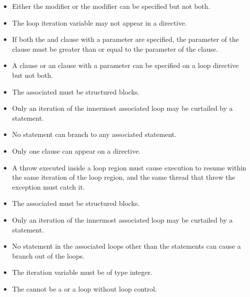 \begin{itemize}
\item Either the  modifier or the  modifier can be specified but not both.

\item The loop iteration variable may not appear in a  directive.

\item If both the  and  clause with a parameter are specified,
the parameter of the  clause must be greater than or equal to the parameter of the
 clause.

\item A  clause or an  clause with a parameter can be specified on a loop directive but not both.
\end{itemize}

\begin{ccppspecific}
\begin{itemize}
\item The associated  must be structured blocks.

\item Only an iteration of the innermost associated loop may be curtailed by a  
statement.

\item No statement can branch to any associated  statement.

\item Only one  clause can appear on a  directive.

\item A throw executed inside a loop region must cause execution to resume within the 
same iteration of the loop region, and the same thread that threw the exception must 
catch it.
\end{itemize}
\end{ccppspecific}

\begin{fortranspecific}
\begin{itemize}
\item The associated  must be structured blocks.

\item Only an iteration of the innermost associated loop may be curtailed by a  
statement.

\item No statement in the associated loops other than the  statements can cause a branch 
out of the loops.

\item The  iteration variable must be of type integer.

\item The  cannot be a  or a  loop without loop control.
\end{itemize}
\end{fortranspecific}

